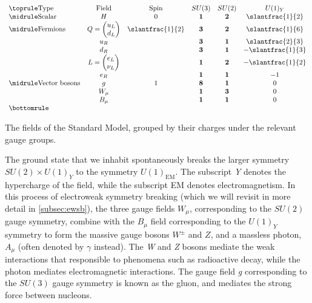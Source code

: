 \begin{table}
  \[
  \begin{array}{lccccc}
    \toprule
   \text{Type}                & \text{Field}              & \text{Spin}      & SU(3)      & SU(2)      & U(1)_Y \\\midrule
   \text{Scalar}              & H                         & 0                & \mathbf{1} & \mathbf{2} & \slantfrac{1}{2}\\\midrule
   \text{Fermions}            & Q = \vdoublet{u_L}{d_L}   & \slantfrac{1}{2} & \mathbf{3} & \mathbf{2} & \slantfrac{1}{6}\\
                              & u_R                       &                  & \mathbf{3} & \mathbf{1} & \slantfrac{2}{3}\\
                              & d_R                       &                  & \mathbf{3} & \mathbf{1} & -\slantfrac{1}{3}\\
                              & L = \vdoublet{e_L}{\nu_L} &                  & \mathbf{1} & \mathbf{2} & -\slantfrac{1}{2}\\
                              & e_R                       &                  & \mathbf{1} & \mathbf{1} & -1\\\midrule
    \text{Vector bosons}      & g                         & 1                & \mathbf{8} & \mathbf{1} & 0 \\
                              & W_\mu                     &                  & \mathbf{1} & \mathbf{3} & 0 \\
                              & B_\mu                     &                  & \mathbf{1} & \mathbf{1} & 0\\
    \bottomrule
  \end{array}
\]
\caption{The fields of the Standard Model, grouped by their charges under the relevant gauge groups.}
\label{tab:SM_fields}
\end{table}

The ground state that we inhabit spontaneously breaks the larger symmetry $SU(2)\times U(1)_Y$ to the symmetry $U(1)_\text{EM}$. The subscript \emph{Y} denotes the hypercharge of the field, while the subscript EM denotes electromagnetism. In this process of electroweak symmetry breaking (which we will revisit in more detail in \autoref{subsec:ewsb}), the three gauge fields $W_\mu$, corresponding to the $SU(2)$ gauge symmetry, combine with the $B_\mu$ field corresponding to the $U(1)_Y$ symmetry to form the massive gauge bosons $W^\pm$ and $Z$, and a massless photon, $A_\mu$ (often denoted by $\gamma$ instead). The \emph{W} and \emph{Z} bosons mediate the weak interactions that responsible to phenomena such as radioactive decay, while the photon mediates electromagnetic interactions. The gauge field \emph{g} corresponding to the $SU(3)$ gauge symmetry is known as the gluon, and mediates the strong force between nucleons. 


